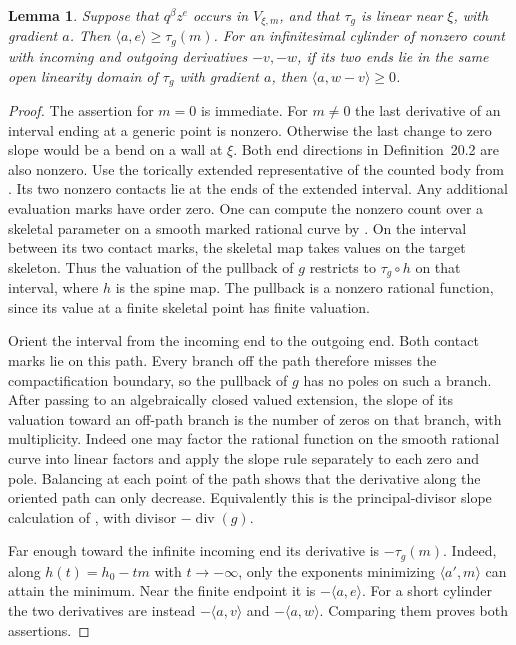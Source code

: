 \documentclass[11pt,reqno]{amsart}
\numberwithin{equation}{section}
\newtheorem{lemma}[theorem]{Lemma}
\theoremstyle{definition}
\theoremstyle{remark}
\begin{document}
\begin{lemma}\label{lem:local-regular-slope}
Suppose that \(q^\beta z^e\) occurs in \(V_{\xi,m}\), and that
\(\tau_g\) is linear near \(\xi\), with gradient \(a\). Then \(\langle a,e\rangle\geq\tau_g(m)\).
For an infinitesimal cylinder of nonzero count with incoming and
outgoing derivatives \(-v,-w\), if its two ends lie in the same open
linearity domain of \(\tau_g\) with gradient \(a\), then
\(\langle a,w-v\rangle\geq0\).
\end{lemma}

\begin{proof}
The assertion for \(m=0\) is immediate. For \(m\ne0\) the last
derivative of an interval ending at a generic point is nonzero. Otherwise the last change to zero slope would be a bend on a wall
at \(\xi\). Both end directions in Definition~20.2 are also nonzero.
Use the torically extended representative of the counted body from
\cite[Construction~9.3, Definition~9.6 and Theorem~11.9]{KY}. Its two nonzero contacts lie at the ends of the extended interval.
Any additional evaluation marks have order zero. One can compute the nonzero count over a
skeletal parameter on a smooth marked rational curve by
\cite[Theorem~8.18 and Lemma~8.21]{KY}. On the interval between its
two contact marks, the skeletal map takes values on the target
skeleton. Thus the valuation of the pullback of \(g\) restricts to
\(\tau_g\circ h\) on that interval, where \(h\) is the spine map.
The pullback is a nonzero rational function, since its value at a
finite skeletal point has finite valuation.

Orient the interval from the incoming end to the outgoing end.
Both contact marks lie on this path. Every branch off the path
therefore misses the compactification boundary, so the pullback of \(g\)
has no poles on such a branch. After passing
to an algebraically closed valued extension, the slope of its
valuation toward an off-path branch is the number of zeros on that
branch, with multiplicity. Indeed one may factor the rational
function on the smooth rational curve into linear factors and apply
the slope rule separately to each zero and pole. Balancing at each
point of the path shows that the derivative along the oriented path
can only decrease. Equivalently this is the principal-divisor slope
calculation of \cite[Lemma~15.6]{KY}, with divisor
\(-\operatorname{div}(g)\).

Far enough toward the infinite incoming end its derivative is
\(-\tau_g(m)\). Indeed, along \(h(t)=h_0-tm\) with \(t\to-\infty\), only
the exponents minimizing \(\langle a',m\rangle\) can attain the
minimum. Near the finite endpoint it is \(-\langle a,e\rangle\).
For a short cylinder the two derivatives are instead
\(-\langle a,v\rangle\) and \(-\langle a,w\rangle\). Comparing
them proves both assertions.
\end{proof}
\end{document}
